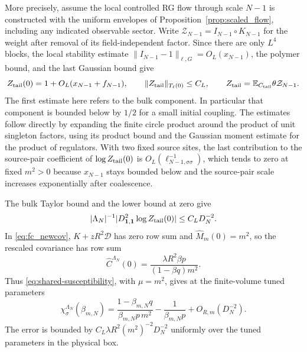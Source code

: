 \documentclass[11pt]{article}
\begin{document}
More precisely, assume the local controlled RG flow through scale
\(N-1\) is constructed with the uniform envelopes of
Proposition~\ref{prop:scaled_flow}, including any indicated
observable sector. Write \(\mathcal Z_{N-1}=I_{N-1}\circ K_{N-1}\)
for the weight after removal of its field-independent factor.
Since there are only \(L^4\) blocks, the local stability estimate
\(\|I_{N-1}-1\|_{\ell,G}=O_L(x_{N-1})\), the polymer bound,
and the last Gaussian bound give
\[
 Z_{\rm tail}(0)=1+O_L(x_{N-1}+f_{N-1}),\qquad
 \|Z_{\rm tail}\|_{T_\ell(0)}\le C_L,
 \qquad Z_{\rm tail}=\mathbb E_{C_{\rm tail}}\theta\mathcal Z_{N-1}.
\]
The first estimate here refers to the bulk component. In particular
that component is bounded below by \(1/2\) for a small initial
coupling. The estimates follow directly by expanding the finite
circle product around the product of unit singleton factors,
using its product bound and the Gaussian moment estimate for
the product of regulators. With two fixed source sites, the
last contribution to the source-pair coefficient of
\(\log Z_{\rm tail}(0)\) is \(O_L(\ell_{N-1,\sigma\sigma}^{-1})\),
which tends to zero at fixed \(m^2>0\) because \(x_{N-1}\) stays
bounded below and the source-pair scale increases exponentially
after coalescence.

The bulk Taylor bound and the lower bound at zero give
\[
 |\Lambda_N|^{-1}
  |D^2_{\boldsymbol1,\boldsymbol1}\log Z_{\rm tail}(0)|
    \le C_L D_N^{-2}.
\]
In \eqref{eq:fc_newcov}, \(K+zR^2\mathcal D\) has zero row sum and
\(\widehat M_m(0)=m^2\), so the rescaled covariance has row sum
\[
 \widehat C^{\Lambda_N}(0)
  =\frac{\lambda R^2\beta p}{(1-\beta q)m^2}.
\]
Thus \eqref{eq:shared-susceptibility}, with \(\mu=m^2\), gives
at the finite-volume tuned parameters
\begin{equation}\label{eq:finite-suscept-error}
 \chi_\sigma^{\Lambda_N}(\beta_{m,N})
 =\frac{1-\beta_{m,N}q}{\beta_{m,N}p\,m^2}
       -\frac1{\beta_{m,N}p}
       +O_{R,m}(D_N^{-2}).
\end{equation}
The error is bounded by \(C_L\lambda R^2(m^2)^{-2}D_N^{-2}\)
uniformly over the tuned parameters in the physical box.
\end{document}

